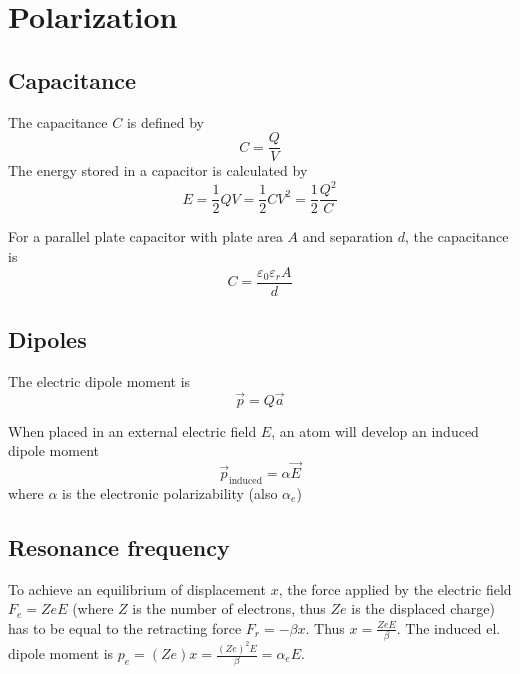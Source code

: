 \section{Polarization}

\subsection{Capacitance}
The capacitance $C$ is defined by
\begin{equation}
	C = \frac{Q}{V}
\end{equation}
The energy stored in a capacitor is calculated by
\begin{equation}
	E = \frac{1}{2} Q V = \frac{1}{2} C V^2 = \frac{1}{2}\frac{Q^2}{C}
\end{equation}

For a parallel plate capacitor with plate area $A$ and separation $d$, the capacitance is
\begin{equation}
	C = \frac{\varepsilon_0 \varepsilon_r A}{d}
\end{equation}

\subsection{Dipoles}

\begin{figure}[ht]
	\centering
	
\end{figure}

The electric dipole moment is
\begin{equation}
	\vec{p} = Q \vec{a}
\end{equation}

When placed in an external electric field $E$, an atom will develop an induced dipole moment
\begin{equation}
	\vec{p}_{\text{induced}} = \alpha \vec{E}
\end{equation}
where $\alpha$ is the electronic polarizability (also $\alpha_e$)

\subsection{Resonance frequency}
To achieve an equilibrium of displacement $x$, the force applied by the electric field $F_e = Ze E$ (where $Z$ is the number of electrons, thus $Z e$ is the displaced charge) has to be equal to the retracting force $F_r = -\beta x$.
Thus $x = \frac{Ze E}{\beta}$. 
The induced el. dipole moment is $p_e = (Ze) x = \frac{(Ze)^2 E}{\beta} = \alpha_e E$.

